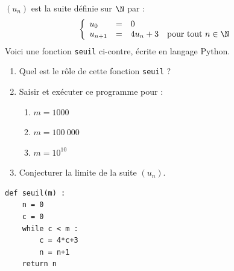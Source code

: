 \documentclass[a4paper,11pt,exos]{nsi} %
\begin{document}
\exo{ \faPython}
\begin{minipage}{0.7\linewidth}
    $(u_n)$ est la suite définie sur $\N$ par :
    $$\left\{
		\begin{array}{llll}
			u_0 & = & 0 & \\
			u_{n+1} & = & 4u_n+3 & \text{pour tout } n\in\N\\
		\end{array}
    \right. $$
    Voici une fonction \texttt{seuil} ci-contre, écrite en langage Python. 
    \begin{enumerate}
        \item Quel est le rôle de cette fonction \texttt{seuil} ?
        \item Saisir et exécuter ce programme pour :
        \begin{multicols}{3}
            \begin{enumerate}[label=\textbullet]
                \item $m=1000$
                \item $m=100\ 000$
                \item $m=10^{10}$
            \end{enumerate}
        \end{multicols}
        
        \item Conjecturer la limite de la suite $(u_n)$.
    \end{enumerate}
\end{minipage}
\begin{minipage}{0.3\linewidth}
    \begin{pyc}
        \begin{verbatim}
def seuil(m) :
    n = 0
    c = 0
    while c < m :
        c = 4*c+3
        n = n+1
    return n
        \end{verbatim}
    \end{pyc}
\end{minipage}
    
\end{document}

